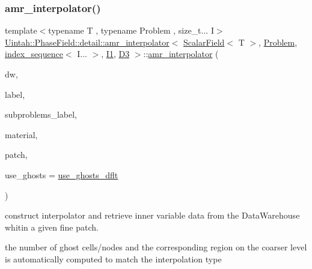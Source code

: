 \subsubsection{\texorpdfstring{amr\+\_\+interpolator()}{amr\_interpolator()}\hspace{0.1cm}{\footnotesize\ttfamily [3/4]}}
{\footnotesize\ttfamily template$<$typename T , typename Problem , size\+\_\+t... I$>$ \\
\hyperlink{classUintah_1_1PhaseField_1_1detail_1_1amr__interpolator}{Uintah\+::\+Phase\+Field\+::detail\+::amr\+\_\+interpolator}$<$ \hyperlink{structUintah_1_1PhaseField_1_1ScalarField}{Scalar\+Field}$<$ T $>$, \hyperlink{classUintah_1_1PhaseField_1_1Problem}{Problem}, \hyperlink{namespaceUintah_1_1PhaseField_a237de804d99512e50613aff7c94a9461}{index\+\_\+sequence}$<$ I... $>$, \hyperlink{namespaceUintah_1_1PhaseField_a547ce3002aa97fbd3ef3192a6eec8406a66f19efe774b0d2b6e5844eb2d83d305}{I1}, \hyperlink{namespaceUintah_1_1PhaseField_a12bfc68444894dffdf0cb8d9cf0cc76aa72fd61934c7ca788c49ad90629f76e78}{D3} $>$\+::\hyperlink{classUintah_1_1PhaseField_1_1detail_1_1amr__interpolator}{amr\+\_\+interpolator} (\begin{DoxyParamCaption}\item[{Data\+Warehouse $\ast$}]{dw,  }\item[{const Var\+Label $\ast$}]{label,  }\item[{const Var\+Label $\ast$}]{subproblems\+\_\+label,  }\item[{int}]{material,  }\item[{const Patch $\ast$}]{patch,  }\item[{bool}]{use\+\_\+ghosts = {\ttfamily \hyperlink{classUintah_1_1PhaseField_1_1detail_1_1amr__interpolator_3_01ScalarField_3_01T_01_4_00_01Problemdf68628a6010a1e1526666730125c372_ac8949b5e1e12de5843d579bed1556ddb}{use\+\_\+ghosts\+\_\+dflt}} }\end{DoxyParamCaption})\hspace{0.3cm}{\ttfamily [inline]}}



construct interpolator and retrieve inner variable data from the Data\+Warehouse whitin a given fine patch. 

the number of ghost cells/nodes and the corresponding region on the coarser level is automatically computed to match the interpolation type


